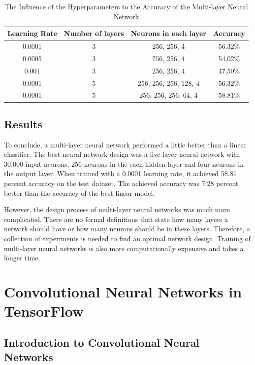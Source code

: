 \begin{table}[h]
\begin{center}
\begin{tabular}{ |c|c|c|c| }
\hline
 Learning Rate &   Number of layers &  Neurons in each layer& Accuracy \\   \hline
0.0001    &   3  &  256, 256, 4  & 56.32\% \\
0.0005    &   3  &  256, 256, 4  & 54.02\% \\
0.001    &   3  &  256, 256, 4  & 47.50\% \\
0.0001    &   5  &  256, 256, 256, 128, 4  & 56.32\% \\
0.0001    &   5  &  256, 256, 256, 64, 4 & 58.81\% \\  
 \hline
\end{tabular}
\caption{The Influence of the Hyperparameters to the Accuracy of the Multi-layer Neural Network  }
\label{table:multi}
\end{center}
\end{table}

\subsection{Results}

To conclude, a multi-layer neural network performed a little better than a linear classifier. The best neural network design was a five layer neural network with 30,000 input neurons, 256 neurons in the each hidden layer and four neurons in the output layer. When trained with a 0.0001 learning rate, it achieved 58.81 percent accuracy on the test dataset. The achieved accuracy was  7.28 percent better than the accuracy of the best linear model. 

However, the design process of multi-layer neural networks was much more complicated. There are no formal definitions that state how many layers a network should have or how many neurons should be in these layers. Therefore, a collection of experiments is needed to find an optimal network design. Training of multi-layer neural networks is also more computationally expensive and takes a longer time.

\section{Convolutional Neural Networks in TensorFlow}

\subsection{Introduction to Convolutional Neural Networks }

